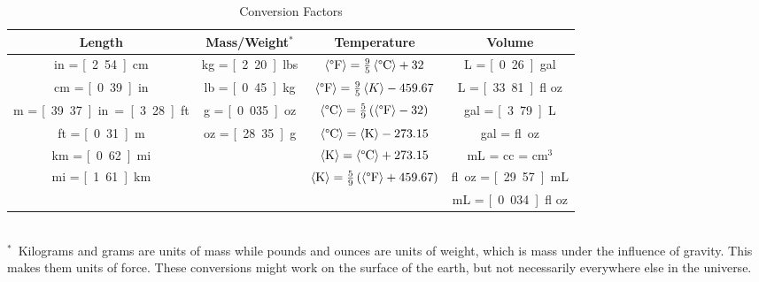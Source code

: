 \begin{table}
	\centering
	\caption{Conversion Factors}
	\begin{tabular}{cccc}
		\hline\hline
		Length	&	Mass/Weight$^*$	&	Temperature	&	Volume\\
		\hline
		\unit[1]{in} = \unit[2.54]{cm}	&	\unit[1]{kg} = \unit[2.20]{lbs}	&	$\left< \text{\textdegree F}\right> = \frac{9}{5}\left< \text{\textdegree C}\right> + 32$	&	\unit[1]{L} = \unit[0.26]{gal}	\\
		\unit[1]{cm} = \unit[0.39]{in}	&	\unit[1]{lb} = \unit[0.45]{kg}	&	$\left< \text{\textdegree F}\right> = \frac{9}{5}\left< {K}\right> - 459.67$	&	\unit[1]{L} = \unit[33.81]{fl oz}	\\
		\unit[1]{m} = \unit[39.37]{in} = \unit[3.28]{ft}	&	\unit[1]{g} = \unit[0.035]{oz}	&	$\left< \text{\textdegree C}\right> = \frac{5}{9}\left(\left< \text{\textdegree F}\right> - 32\right)$	&	\unit[1]{gal} = \unit[3.79]{L}	\\
		\unit[1]{ft} = \unit[0.31]{m}	&	\unit[1]{oz} = \unit[28.35]{g}	&	$\left< \text{\textdegree C}\right> = \left< \text{K}\right> - 273.15$	&	\unit[1]{gal} = \unit[128]{fl oz}	\\
		\unit[1]{km} = \unit[0.62]{mi}	&&	$\left< \text{K}\right> = \left< \text{\textdegree C}\right> + 273.15$	&	\unit[1]{mL} = \unit[1]{cc} = \unit[1]{cm$^3$}	\\
		\unit[1]{mi} = \unit[1.61]{km}	&&	$\left< \text{K}\right> = \frac{5}{9}\left(\left< \text{\textdegree F}\right> + 459.67\right)$	&	\unit[1]{fl oz} = \unit[29.57]{mL}	\\
		&&&	\unit[1]{mL} = \unit[0.034]{fl oz}	\\
		\hline\hline
	\end{tabular}\\
	\footnotesize{$^*$~Kilograms and grams are units of mass while pounds and ounces are units of weight, which is mass under the influence of gravity. This makes them units of force. These conversions might work on the surface of the earth, but not necessarily everywhere else in the universe.}
\end{table}


